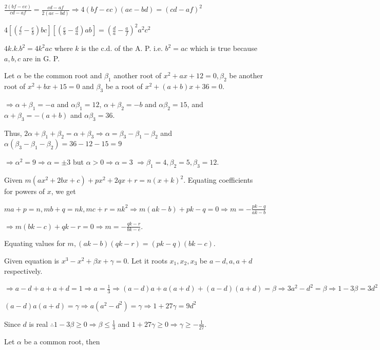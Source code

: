   $\frac{2(bf - ec)}{cd - af} = \frac{cd - af}{2(ae - bd)}\Rightarrow 4(bf - ec)(ae - bd) = (cd - af)^2$

  $4\left[\left(\frac{f}{c} - \frac{e}{b}\right)bc\right]\left[\left(\frac{e}{b} - \frac{d}{a}\right)ab\right]
  = \left(\frac{d}{a} - \frac{a}{f}\right)^2a^2c^2$

  $4k.k.b^2 = 4k^2ac$ where $k$ is the c.d. of the A. P. i.e. $b^2 = ac$ which is true because $a, b, c$ are
  in G. P.
\item Let $\alpha$ be the common root and $\beta_1$ another root of $x^2 + ax + 12 = 0, \beta_2$ be
  another root of $x^2 + bx + 15 = 0$ and $\beta_3$ be a root of $x^2 + (a + b)x + 36 = 0$.

  $\Rightarrow \alpha + \beta_1 = -a$ and $\alpha\beta_1 = 12$, $\alpha + \beta_2 = -b$ and $\alpha\beta_2 =
  15$, and $\alpha + \beta_3 = -(a + b)$ and $\alpha\beta_3 = 36$.

  Thus, $2\alpha + \beta_1 + \beta_2 = \alpha + \beta_3 \Rightarrow \alpha = \beta_3 - \beta_1 - \beta_2$
  and $\alpha(\beta_3 - \beta_1 - \beta_2) = 36 - 12 - 15 = 9$

  $\Rightarrow \alpha^2 = 9 \Rightarrow \alpha = \pm 3$ but $\alpha > 0 \Rightarrow \alpha = 3$
  $\Rightarrow \beta_1 = 4, \beta_2 = 5, \beta_3 = 12$.
\item Given $m(ax^2 + 2bx + c) + px^2 + 2qx + r = n(x + k)^2$. Equating coefficients for powers of $x$, we get

  $ma + p = n, mb + q = nk, mc + r = nk^2\Rightarrow m(ak - b) + pk - q = 0 \Rightarrow m = -\frac{pk - q}{ak - b}$

  $\Rightarrow m(bk - c) + qk - r = 0 \Rightarrow m = -\frac{qk - r}{bk - c}$.

  Equating values for $m, (ak - b)(qk - r) = (pk - q)(bk - c)$.
\item Given equation is $x^3 - x^2 + \beta x + \gamma = 0$. Let it roots $x_1, x_2, x_3$ be $a - d, a, a +
  d$ respectively.

  $\Rightarrow a - d + a + a + d = 1 \Rightarrow a = \frac{1}{3}\Rightarrow (a - d)a + a(a + d) + (a - d)(a +
    d) = \beta \Rightarrow 3a^2 - d^2 = \beta \Rightarrow 1 - 3\beta = 3d^2$

  $(a - d)a(a + d) = \gamma \Rightarrow a(a^2 - d^2) = \gamma \Rightarrow 1 + 27\gamma = 9d^2$

  Since $d$ is real $\therefore 1 - 3\beta \ge 0 \Rightarrow \beta \le \frac{1}{3}$ and $1 + 27\gamma \ge 0
  \Rightarrow \gamma \ge -\frac{1}{27}$.
\item Let $\alpha$ be a common root, then

